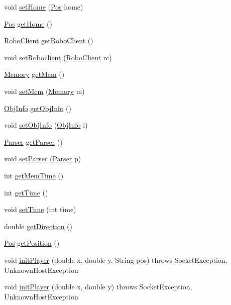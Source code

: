 \begin{DoxyCompactItemize}
\item 
void \hyperlink{classPlayer_a37c708420f7230019e80d664533eddc8}{setHome} (\hyperlink{classPos}{Pos} home)
\item 
\hyperlink{classPos}{Pos} \hyperlink{classPlayer_a90a227e48446e51923377c495b39f008}{getHome} ()
\item 
\hyperlink{classRoboClient}{RoboClient} \hyperlink{classPlayer_a633389a933930a00f75601ea957caa83}{getRoboClient} ()
\item 
void \hyperlink{classPlayer_a70a35e4a1de2cc70d947adffc0e2d580}{setRoboclient} (\hyperlink{classRoboClient}{RoboClient} rc)
\item 
\hyperlink{classMemory}{Memory} \hyperlink{classPlayer_ab43d9af06168c486d9fa0539103102a0}{getMem} ()
\item 
void \hyperlink{classPlayer_a92bd7c2bbebfc30ec332d6e6b182f9a8}{setMem} (\hyperlink{classMemory}{Memory} m)
\item 
\hyperlink{classObjInfo}{ObjInfo} \hyperlink{classPlayer_a6ca7539da0375519ff9f5993b19073f0}{getObjInfo} ()
\item 
void \hyperlink{classPlayer_a51bf665263845828767153fb4b418337}{setObjInfo} (\hyperlink{classObjInfo}{ObjInfo} i)
\item 
\hyperlink{classParser}{Parser} \hyperlink{classPlayer_a8898fbd58b68f21318bd83a3a4446a1f}{getParser} ()
\item 
void \hyperlink{classPlayer_a914ba43cef17a1ce6f210311155925a6}{setParser} (\hyperlink{classParser}{Parser} p)
\item 
int \hyperlink{classPlayer_a0f037644cf072cb8f24cd98919be4a02}{getMemTime} ()
\item 
int \hyperlink{classPlayer_a0405759b5c1c513a387b09739c271743}{getTime} ()
\item 
void \hyperlink{classPlayer_afca6d7498e56e2e82ddea7e89395a146}{setTime} (int time)
\item 
double \hyperlink{classPlayer_a2ff5bd2585d3d7388dce85576002c668}{getDirection} ()
\item 
\hyperlink{classPos}{Pos} \hyperlink{classPlayer_ae1947ff6dfb298de4699f9f79ea221cf}{getPosition} ()
\item 
void \hyperlink{classPlayer_aa826be330bb3dc6bf7bb8ac04250fe50}{initPlayer} (double x, double y, String pos)  throws SocketException, UnknownHostException 
\item 
void \hyperlink{classPlayer_a29c711f9c1d5bb762611f8e0f8c2fd47}{initPlayer} (double x, double y)  throws SocketException, UnknownHostException 
\item 

\end{DoxyCompactItemize}
